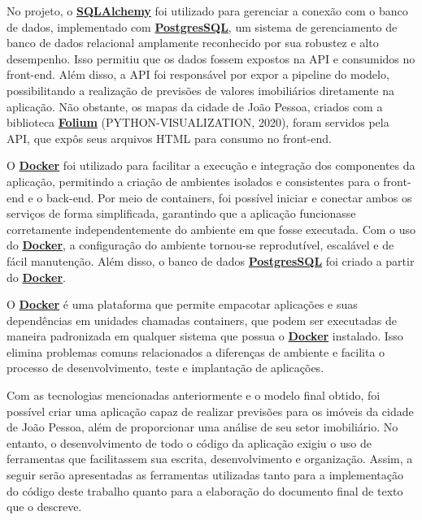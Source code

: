 \documentclass[
  12pt,
  a4paper,
]{scrreprt}
\begin{document}
No projeto, o \href{https://www.sqlalchemy.org/}{\textbf{SQLAlchemy}}
foi utilizado para gerenciar a conexão com o banco de dados,
implementado com
\href{https://www.postgresql.org/}{\textbf{PostgresSQL}}, um sistema de
gerenciamento de banco de dados relacional amplamente reconhecido por
sua robustez e alto desempenho. Isso permitiu que os dados fossem
expostos na API e consumidos no front-end. Além disso, a API foi
responsável por expor a pipeline do modelo, possibilitando a realização
de previsões de valores imobiliários diretamente na aplicação. Não
obstante, os mapas da cidade de João Pessoa, criados com a biblioteca
\href{https://python-visualization.github.io/folium/latest/}{\textbf{Folium}}
(PYTHON-VISUALIZATION, 2020), foram servidos pela API, que expôs seus
arquivos HTML para consumo no front-end.

\vspace{12pt}

O \href{https://www.docker.com/}{\textbf{Docker}} foi utilizado para
facilitar a execução e integração dos componentes da aplicação,
permitindo a criação de ambientes isolados e consistentes para o
front-end e o back-end. Por meio de containers, foi possível iniciar e
conectar ambos os serviços de forma simplificada, garantindo que a
aplicação funcionasse corretamente independentemente do ambiente em que
fosse executada. Com o uso do
\href{https://www.docker.com/}{\textbf{Docker}}, a configuração do
ambiente tornou-se reprodutível, escalável e de fácil manutenção. Além
disso, o banco de dados
\href{https://www.postgresql.org/}{\textbf{PostgresSQL}} foi criado a
partir do \href{https://www.docker.com/}{\textbf{Docker}}.

\vspace{12pt}

O \href{https://www.docker.com/}{\textbf{Docker}} é uma plataforma que
permite empacotar aplicações e suas dependências em unidades chamadas
containers, que podem ser executadas de maneira padronizada em qualquer
sistema que possua o \href{https://www.docker.com/}{\textbf{Docker}}
instalado. Isso elimina problemas comuns relacionados a diferenças de
ambiente e facilita o processo de desenvolvimento, teste e implantação
de aplicações.

\vspace{12pt}

Com as tecnologias mencionadas anteriormente e o modelo final obtido,
foi possível criar uma aplicação capaz de realizar previsões para os
imóveis da cidade de João Pessoa, além de proporcionar uma análise de
seu setor imobiliário. No entanto, o desenvolvimento de todo o código da
aplicação exigiu o uso de ferramentas que facilitassem sua escrita,
desenvolvimento e organização. Assim, a seguir serão apresentadas as
ferramentas utilizadas tanto para a implementação do código deste
trabalho quanto para a elaboração do documento final de texto que o
descreve.
\end{document}
